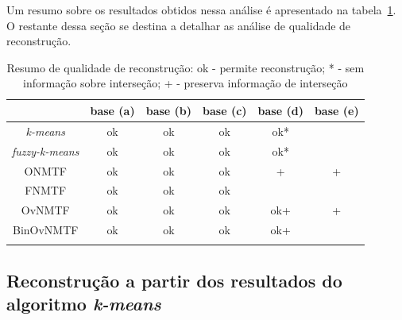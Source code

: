 \documentclass[
    12pt,                %
    oneside,            %
    a4paper,            %
    english,            %
    brazil                %
    ]{abntex2ppgsi}
\begin{document}
Um resumo sobre os resultados obtidos nessa análise é apresentado na tabela~\ref{tab:resumoREC}. O restante dessa seção se destina a detalhar as análise de qualidade de reconstrução.

\begin{table}[htpb]
\centering
    \caption{Resumo de qualidade de reconstrução: ok - permite reconstrução; * - sem informação sobre interseção; + - preserva informação de interseção}
        \begin{tabular}{cccccc}
            \hline
            & \textbf{base (a)} & \textbf{base (b)} & \textbf{base (c)} & \textbf{base (d) }& \textbf{base (e)} \\
            \hline
            \textit{k-means}       & ok & ok & ok & ok*  &  \\
            \textit{  fuzzy-k-means} & ok & ok & ok & ok*  &  \\
            ONMTF         & ok & ok & ok & +    & +  \\
            FNMTF         & ok & ok & ok &    &  \\
            OvNMTF        & ok & ok & ok & ok+  & + \\
            BinOvNMTF     & ok & ok & ok & ok+  &  \\
            \hline
             & & & & &  \\
        \end{tabular}
    \label{tab:resumoREC}
\end{table}



\subsection{Reconstrução a partir dos resultados do algoritmo \textit{k-means}}
\label{subsec:results-reconstruction-kmeans}
\end{document}
